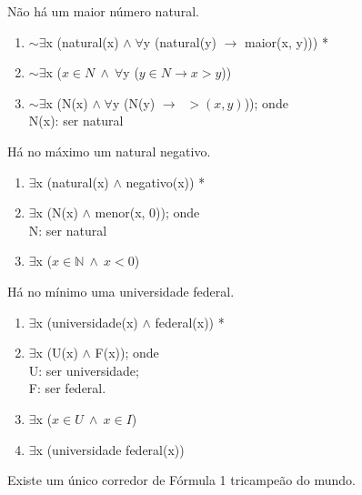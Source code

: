 \bigskip
\begin{exemplo} Não há um maior número natural.
\end{exemplo}

\begin{enumerate}[label=(\roman*)]
    \item $\sim \exists$x (natural(x) $\land \; \forall$y (natural(y) $\to$ maior(x, y))) *
    \item $\sim \exists$x ($x \in N\ \land\ \forall$y ($y \in N \to x > y$))
    \item $\sim \exists$x (N(x) $\land \; \forall$y (N(y) $\to \;\; > (x, y)$)); onde\\
    N(x): ser natural
\end{enumerate}

\bigskip
\begin{exemplo} Há no máximo um natural negativo.
\end{exemplo}

\begin{enumerate}[label=(\roman*)]
    \item \underline{$\exists$}x (natural(x) $\land$ negativo(x)) *
    \item \underline{$\exists$}x (N(x) $\land$ menor(x, 0)); onde\\
    N: ser natural
    \item \underline{$\exists$}x ($x \in \mathbb{N}\ \land\ x < 0$)
\end{enumerate}

\bigskip
\begin{exemplo} Há no mínimo uma universidade federal.
 \end{exemplo}

\begin{enumerate}[label=(\roman*)]
    \item $\exists$x (universidade(x) $\land$ federal(x)) *
    \item $\exists$x (U(x) $\land$ F(x)); onde\\
    U: ser universidade;\\
    F: ser federal.
    \item $\exists$x ($x \in U\ \land\ x \in I$)
    \item $\exists$x (universidade federal(x))
\end{enumerate}

\bigskip
\begin{exemplo} Existe um único corredor de Fórmula 1 tricampeão do mundo.
\end{exemplo}

